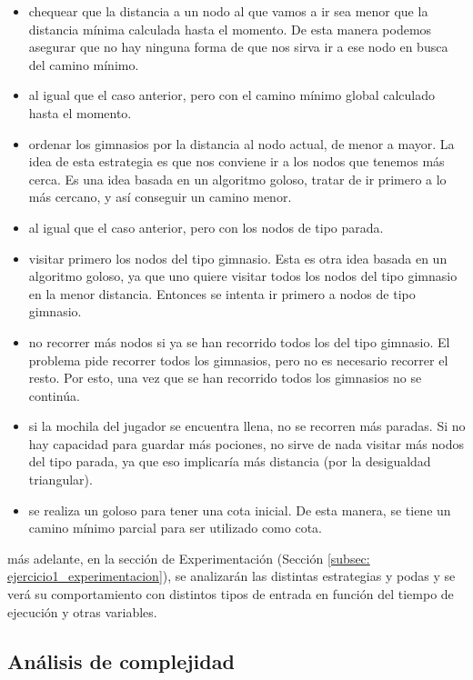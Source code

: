 \begin{itemize}
	\item chequear que la distancia a un nodo al que vamos a ir sea menor que la distancia mínima calculada hasta el momento. De esta manera podemos asegurar que no hay ninguna forma de que nos sirva ir a ese nodo en busca del camino mínimo.
	\item al igual que el caso anterior, pero con el camino mínimo global calculado hasta el momento.
	\item ordenar los gimnasios por la distancia al nodo actual, de menor a mayor. La idea de esta estrategia es que nos conviene ir a los nodos que tenemos más cerca. Es una idea basada en un algoritmo goloso, tratar de ir primero a lo más cercano, y así conseguir un camino menor.
	\item al igual que el caso anterior, pero con los nodos de tipo parada.
	\item visitar primero los nodos del tipo gimnasio. Esta es otra idea basada en un algoritmo goloso, ya que uno quiere visitar todos los nodos del tipo gimnasio en la menor distancia. Entonces se intenta ir primero a nodos de tipo gimnasio.
	\item no recorrer más nodos si ya se han recorrido todos los del tipo gimnasio. El problema pide recorrer todos los gimnasios, pero no es necesario recorrer el resto. Por esto, una vez que se han recorrido todos los gimnasios no se continúa.
	\item si la mochila del jugador se encuentra llena, no se recorren más paradas. Si no hay capacidad para guardar más pociones, no sirve de nada visitar más nodos del tipo parada, ya que eso implicaría más distancia (por la desigualdad triangular).
	\item se realiza un goloso para tener una cota inicial. De esta manera, se tiene un camino mínimo parcial para ser utilizado como cota.
\end{itemize}

\par más adelante, en la sección de Experimentación (Sección \ref{subsec: ejercicio1_experimentacion}), se analizarán las distintas estrategias y podas y se verá su comportamiento con distintos tipos de entrada en función del tiempo de ejecución y otras variables.



\subsection{Análisis de complejidad}


